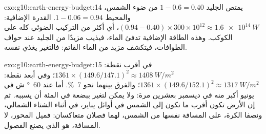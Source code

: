 \begin{solution}{exo:g10:earth-energy-budget:14}
يمتص الجليد $1 - 0.6 = 0.40$ من ضوء الشمس، والمحيط $1 - 0.06 =
0.94$. القدرة الإضافية: $(0.94 - 0.40) \times 300 \times 10^{12} \approx
\qty{1.6e14}{W}$، أي أكثر من التركيب الضوئي كله على الكوكب. وهذه الطاقة الإضافية
تدفئ الماء، فيذيب مزيدًا من الجليد عند حواف الطوافات، فيتكشف مزيد من الماء
القاتم: فالتغير يغذي نفسه.
\end{solution}

\begin{solution}{exo:g10:earth-energy-budget:15}
في أقرب نقطة: $1361 \times (149.6/147.1)^2 \approx \qty{1408}{W/m^2}$؛ وفي أبعد
نقطة: $1361 \times (149.6/152.1)^2 \approx \qty{1317}{W/m^2}$؛ والفرق بينهما نحو
\qty{7}{\percent}. أما عند \qty{60}{\degree} ش  في يونيو أكبر منه في
ديسمبر بعشرين مرة: ولا يمكن لتغير ببضعة في المئة أن يسببه. ثم إن الأرض تكون أقرب
ما تكون إلى الشمس في أوائل يناير، في أثناء الشتاء الشمالي، ونصفا الكرة، على
المسافة نفسها من الشمس، لهما فصلان متعاكسان: فميل المحور، لا المسافة، هو الذي
يصنع الفصول.
\end{solution}

